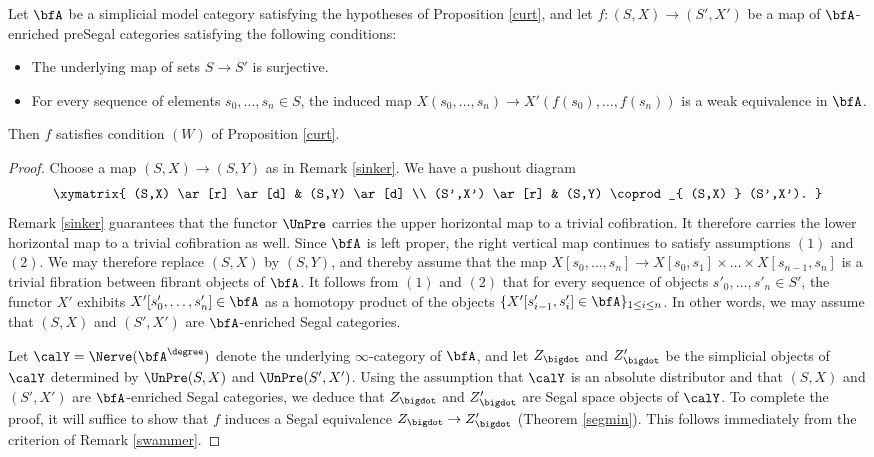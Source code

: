 \begin{lemma}\label{strongbad1}
Let $\bfA$ be a simplicial model category satisfying the hypotheses of Proposition
\ref{curt}, and let $f: (S,X) \rightarrow (S',X')$ be a map of $\bfA$-enriched preSegal
categories satisfying the following conditions:
\begin{itemize}
\item[$(1)$] The underlying map of sets $S \rightarrow S'$ is surjective.
\item[$(2)$] For every sequence of elements $s_0, \ldots, s_n \in S$, the induced map
$X( s_0, \ldots, s_n) \rightarrow X'( f(s_0), \ldots, f(s_n) )$ is a weak equivalence in $\bfA$.
\end{itemize}
Then $f$ satisfies condition $(W)$ of Proposition \ref{curt}.
\end{lemma}

\begin{proof}
Choose a map $(S,X) \rightarrow (S,Y)$ as in Remark \ref{sinker}.
We have a pushout diagram
$$ \xymatrix{ (S,X) \ar[r] \ar[d] & (S,Y) \ar[d] \\
(S',X') \ar[r] & (S,Y) \coprod_{ (S,X) } (S',X'). }$$
Remark \ref{sinker} guarantees that the functor $\UnPre$ carries the upper horizontal map
to a trivial cofibration. It therefore carries the lower horizontal map to a trivial cofibration as well.
Since $\bfA$ is left proper, the right vertical map continues to satisfy assumptions
$(1)$ and $(2)$. We may therefore replace $(S,X)$ by $(S,Y)$, and thereby assume that the map
$X[s_0, \ldots, s_n] \rightarrow X[s_0, s_1] \times \ldots \times X[s_{n-1}, s_n]$ is
a trivial fibration between fibrant objects of $\bfA$. It follows from $(1)$ and $(2)$
that for every sequence of objects $s'_0, \ldots, s'_n \in S'$, the functor $X'$
exhibits $X'[ s'_0, \ldots, s'_n] \in \bfA$ as a homotopy product of the objects
$\{ X'[ s'_{i-1}, s'_i] \in \bfA \}_{1 \leq i \leq n}$. In other words, we may assume that
$(S,X)$ and $(S',X')$ are $\bfA$-enriched Segal categories.

Let $\calY = \Nerve( \bfA^{\degree})$ denote the underlying $\infty$-category of $\bfA$, and let
$Z_{\bigdot}$ and $Z'_{\bigdot}$ be the simplicial objects of $\calY$ determined by
$\UnPre(S,X)$ and $\UnPre(S',X')$. Using the assumption that $\calY$ is an absolute distributor
and that $(S,X)$ and $(S',X')$ are $\bfA$-enriched Segal categories, we deduce that 
$Z_{\bigdot}$ and $Z'_{\bigdot}$ are Segal space objects of $\calY$. To complete the
proof, it will suffice to show that $f$ induces a Segal equivalence $Z_{\bigdot} \rightarrow
Z'_{\bigdot}$ (Theorem \ref{segmin}). This follows immediately from the criterion of
Remark \ref{swammer}.
\end{proof}

